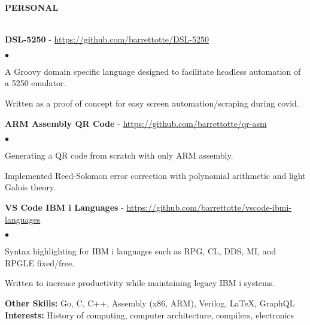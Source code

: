 \documentclass{article}
\newcommand{\lineunder}{
	\vspace*{-4pt}\\ 
	\hspace*{-18pt}\hrulefill \\
}
\newcommand{\header}[1]{
	{\hspace*{-15pt}\vspace*{6pt}\textsc{#1}}\vspace*{-6pt}\lineunder
}
\newcommand{\project}[2]{
	\vspace*{3pt} \textbf{#1} - \small{\href{#2}{#2}}
}
\newenvironment{resumelist}{
	\vspace*{2pt}
	\begin{list}
		{\small$\bullet$}{\topsep 0pt \itemsep -2pt}}{\vspace*{4pt}
	\end{list}
}
\newcommand{\resumeheader}[1]{
	\vspace*{14pt}
	\header{\textbf{#1}}
    \vspace*{5pt}
}
\begin{document}
	\resumeheader{PERSONAL}
		\project
			{DSL-5250}{https://github.com/barrettotte/DSL-5250}
			\begin{resumelist}
				\item A Groovy domain specific language designed to facilitate headless automation of a 5250 emulator.
				\item Written as a proof of concept for easy screen automation/scraping during covid.
			\end{resumelist}
		\project
			{ARM Assembly QR Code}{https://github.com/barrettotte/qr-asm}
			\begin{resumelist}
				\item Generating a QR code from scratch with only ARM assembly.
				\item Implemented Reed-Solomon error correction with polynomial arithmetic and light Galois theory.
			\end{resumelist}
		\project
			{VS Code IBM i Languages}{https://github.com/barrettotte/vscode-ibmi-languages}
			\begin{resumelist}
				\item Syntax highlighting for IBM i languages such as RPG, CL, DDS, MI, and RPGLE fixed/free.
				\item Written to increase productivity while maintaining legacy IBM i systems.
			\end{resumelist}
		\vspace*{12pt}
		\textbf{Other Skills:}
			Go, C, {C\tiny{++}}, Assembly (x86, ARM), Verilog, LaTeX, GraphQL\\
			\vspace*{5pt}
		\textbf{Interests:}
			History of computing, computer architecture, compilers, electronics\\
\end{document}
